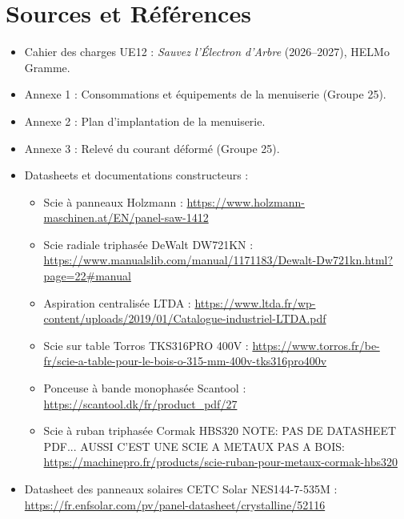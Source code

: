 \documentclass[11pt,a4paper]{article}
\begin{document}
\section{Sources et Références}
\begin{itemize}
    \item Cahier des charges UE12 : \emph{Sauvez l'Électron d'Arbre} (2026--2027), HELMo Gramme.
    \item Annexe 1 : Consommations et équipements de la menuiserie (Groupe 25).
    \item Annexe 2 : Plan d'implantation de la menuiserie.
    \item Annexe 3 : Relevé du courant déformé (Groupe 25).
    \item Datasheets et documentations constructeurs :
    \begin{itemize}
        \item Scie à panneaux Holzmann : \url{https://www.holzmann-maschinen.at/EN/panel-saw-1412}
        \item Scie radiale triphasée DeWalt DW721KN : \url{https://www.manualslib.com/manual/1171183/Dewalt-Dw721kn.html?page=22#manual}
        \item Aspiration centralisée LTDA : \url{https://www.ltda.fr/wp-content/uploads/2019/01/Catalogue-industriel-LTDA.pdf}
        \item Scie sur table Torros TKS316PRO 400V : \url{https://www.torros.fr/be-fr/scie-a-table-pour-le-bois-o-315-mm-400v-tks316pro400v}
        \item Ponceuse à bande monophasée Scantool : \url{https://scantool.dk/fr/product_pdf/27}
        \item Scie à ruban triphasée Cormak HBS320 NOTE: PAS DE DATASHEET PDF... AUSSI C'EST UNE SCIE A METAUX PAS A BOIS: \url{https://machinepro.fr/products/scie-ruban-pour-metaux-cormak-hbs320}
    \end{itemize}
    \item Datasheet des panneaux solaires CETC Solar NES144-7-535M : \url{https://fr.enfsolar.com/pv/panel-datasheet/crystalline/52116}
\end{itemize}
\end{document}
